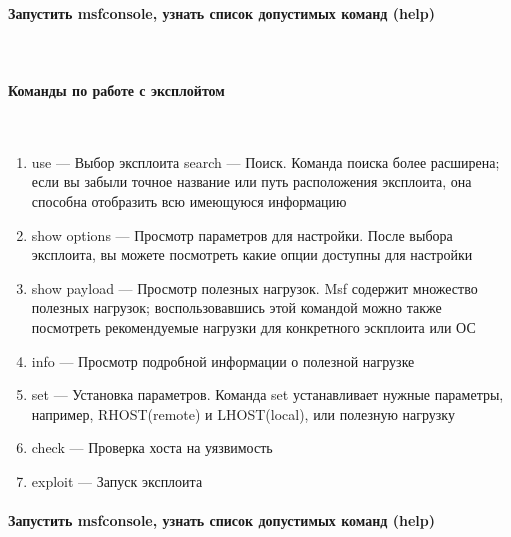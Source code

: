 \documentclass{article}
\begin{document}
\paragraph{Запустить msfconsole, узнать список допустимых команд (help)}
~

\paragraph{Команды по работе с эксплойтом}
~

\begin{enumerate}
\item use — Выбор эксплоита
search — Поиск. Команда поиска более расширена; если вы забыли точное название или путь расположения эксплоита, она способна отобразить всю имеющуюся информацию
\item show options — Просмотр параметров для настройки. После выбора эксплоита, вы можете посмотреть какие опции доступны для настройки
\item show payload — Просмотр полезных нагрузок. Msf содержит множество полезных нагрузок; воспользовавшись этой командой можно также посмотреть рекомендуемые нагрузки для конкретного эскплоита или ОС
\item info — Просмотр подробной информации о полезной нагрузке
\item set — Установка параметров. Команда set устанавливает нужные параметры, например, RHOST(remote) и LHOST(local), или полезную нагрузку 
\item check — Проверка хоста на уязвимость
\item exploit — Запуск эксплоита
\end{enumerate}

\paragraph{Запустить msfconsole, узнать список допустимых команд (help)}
~
\end{document}
